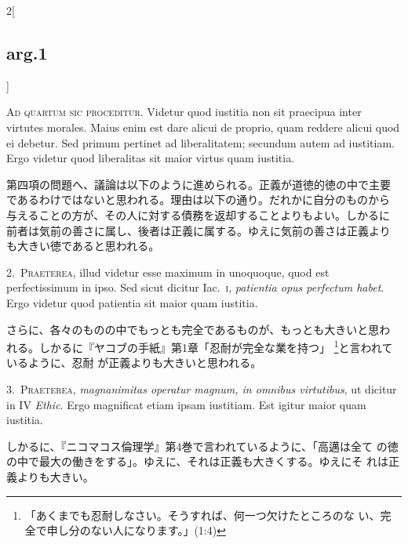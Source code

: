 \documentclass[paper=a4paper,fontsize=10pt,jafontsize=9pt,titlepage]{jlreq}
\begin{document}
\begin{paracol}{2}[\subsection{arg.1}]

{\scshape Ad quartum sic proceditur}. Videtur quod iustitia non sit
praecipua inter virtutes morales. Maius enim est dare alicui de
proprio, quam reddere alicui quod ei debetur. Sed primum pertinet ad
liberalitatem; secundum autem ad iustitiam. Ergo videtur quod
liberalitas sit maior virtus quam iustitia.

\switchcolumn

第四項の問題へ、議論は以下のように進められる。正義が道徳的徳の中で主要
であるわけではないと思われる。理由は以下の通り。だれかに自分のものから
与えることの方が、その人に対する債務を返却することよりもよい。しかるに
前者は気前の善さに属し、後者は正義に属する。ゆえに気前の善さは正義より
も大きい徳であると思われる。


2.~{\scshape Praeterea}, illud videtur esse maximum in unoquoque, quod
est perfectissimum in ipso. Sed sicut dicitur Iac.~{\scshape i},
{\itshape patientia opus perfectum habet}. Ergo videtur quod patientia
sit maior quam iustitia.

\switchcolumn

さらに、各々のものの中でもっとも完全であるものが、もっとも大きいと思わ
れる。しかるに『ヤコブの手紙』第1章「忍耐が完全な業を持つ」
\footnote{「あくまでも忍耐しなさい。そうすれば、何一つ欠けたところのな
い、完全で申し分のない人になります。」(1:4)}と言われているように、忍耐
が正義よりも大きいと思われる。


3.~{\scshape Praeterea}, {\itshape magnanimitas operatur magnum, in
omnibus virtutibus}, ut dicitur in IV {\itshape Ethic}. Ergo
magnificat etiam ipsam iustitiam. Est igitur maior quam iustitia.

\switchcolumn

しかるに、『ニコマコス倫理学』第4巻で言われているように、「高邁は全て
の徳の中で最大の働きをする」。ゆえに、それは正義も大きくする。ゆえにそ
れは正義よりも大きい。


\end{paracol}
\end{document}
